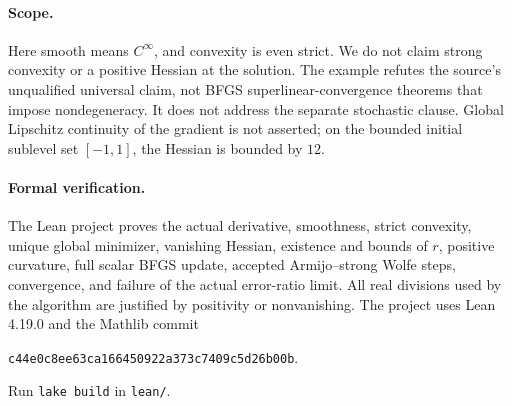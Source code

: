 \documentclass[11pt]{article}
\begin{document}
\paragraph{Scope.}
Here smooth means $C^\infty$, and convexity is even strict. We do not claim strong convexity or a positive Hessian at the solution. The example refutes the source's unqualified universal claim, not BFGS superlinear-convergence theorems that impose nondegeneracy. It does not address the separate stochastic clause. Global Lipschitz continuity of the gradient is not asserted; on the bounded initial sublevel set $[-1,1]$, the Hessian is bounded by $12$.

\paragraph{Formal verification.}
The Lean project proves the actual derivative, smoothness, strict convexity, unique global minimizer, vanishing Hessian, existence and bounds of $r$, positive curvature, full scalar BFGS update, accepted Armijo--strong Wolfe steps, convergence, and failure of the actual error-ratio limit. All real divisions used by the algorithm are justified by positivity or nonvanishing. The project uses Lean 4.19.0 and the Mathlib commit
\begin{center}\small\texttt{c44e0c8ee63ca166450922a373c7409c5d26b00b}.\end{center}
Run \texttt{lake build} in \texttt{lean/}.
\end{document}
